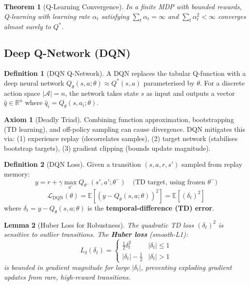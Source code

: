 \documentclass[12pt,a4paper]{article}
\theoremstyle{definition}
\newtheorem{definition}{Definition}[section]
\newtheorem{axiom}{Axiom}[section]
\theoremstyle{plain}
\newtheorem{theorem}{Theorem}[section]
\newtheorem{lemma}[theorem]{Lemma}
\theoremstyle{remark}
\newcommand{\R}{\mathbb{R}}
\newcommand{\Loss}{\mathcal{L}}
\newcommand{\Qeval}{Q_\theta}
\newcommand{\Qtgt}{Q_{\theta^-}}
\newcommand{\EE}{\mathbb{E}}
\begin{document}
\begin{theorem}[Q-Learning Convergence]
In a finite MDP with bounded rewards, Q-learning with learning rate $\alpha_t$ satisfying $\sum_t \alpha_t = \infty$ and $\sum_t \alpha_t^2 < \infty$ converges almost surely to $Q^*$.
\end{theorem}

\subsection{Deep Q-Network (DQN)}

\begin{definition}[DQN Q-Network]
A DQN replaces the tabular Q-function with a deep neural network $\Qeval(s, a; \theta) \approx Q^*(s, a)$ parameterised by $\theta$. For a discrete action space $|\mathcal{A}| = n$, the network takes state $s$ as input and outputs a vector $\hat{q} \in \R^n$ where $\hat{q}_i = \Qeval(s, a_i; \theta)$.
\end{definition}

\begin{axiom}[Deadly Triad]
Combining function approximation, bootstrapping (TD learning), and off-policy sampling can cause divergence. DQN mitigates this via: (1) experience replay (decorrelates samples), (2) target network (stabilises bootstrap targets), (3) gradient clipping (bounds update magnitude).
\end{axiom}

\begin{definition}[DQN Loss]
Given a transition $(s, a, r, s')$ sampled from replay memory:
\[
  y = r + \gamma \max_{a'} \Qtgt(s', a'; \theta^-)
  \quad\text{(TD target, using frozen } \theta^-)
\]
\[
  \Loss_{\text{DQN}}(\theta) = \EE\!\left[(y - \Qeval(s, a; \theta))^2\right]
  = \EE\!\left[(\delta_t)^2\right]
\]
where $\delta_t = y - \Qeval(s, a; \theta)$ is the \textbf{temporal-difference (TD) error}.
\end{definition}

\begin{lemma}[Huber Loss for Robustness]
The quadratic TD loss $(\delta_t)^2$ is sensitive to outlier transitions. The \textbf{Huber loss} (smooth-L1):
\[
  L_\delta(\delta_t) = \begin{cases}
    \frac{1}{2}\delta_t^2 & |\delta_t| \le 1 \\
    |\delta_t| - \frac{1}{2} & |\delta_t| > 1
  \end{cases}
\]
is bounded in gradient magnitude for large $|\delta_t|$, preventing exploding gradient updates from rare, high-reward transitions.
\end{lemma}
\end{document}
